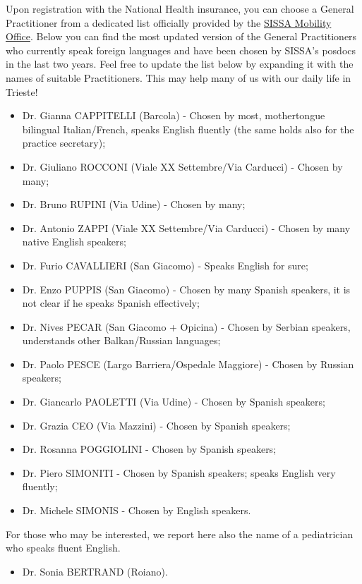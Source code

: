\documentclass{sissavademecum}
\begin{document}
Upon registration with the National Health insurance, you can choose a General Practitioner from a dedicated list officially provided by the \href{mobility@sissa.it}{SISSA Mobility Office}. Below you can find the most updated version of the General Practitioners who currently speak foreign languages and have been chosen by SISSA's posdocs in the last two years. Feel free to update the list below by expanding it with the names of suitable Practitioners. This may help many of us with our daily life in Trieste!
\begin{itemize}
    \item Dr. Gianna CAPPITELLI (Barcola) - Chosen by most, mothertongue bilingual Italian/French, speaks English fluently (the same holds also for the practice secretary);
    \item Dr. Giuliano ROCCONI (Viale XX Settembre/Via Carducci) - Chosen by many;
    \item Dr. Bruno RUPINI (Via Udine) - Chosen by many;
    \item Dr. Antonio ZAPPI (Viale XX Settembre/Via Carducci) - Chosen by many native English speakers;
    \item Dr. Furio CAVALLIERI (San Giacomo) - Speaks English for sure;
    \item Dr. Enzo PUPPIS (San Giacomo) - Chosen by many Spanish speakers, it is not clear if he speaks Spanish effectively;
    \item Dr. Nives PECAR (San Giacomo + Opicina) - Chosen by Serbian speakers, understands other Balkan/Russian languages;
    \item Dr. Paolo PESCE (Largo Barriera/Ospedale Maggiore) - Chosen by Russian speakers;
    \item Dr. Giancarlo PAOLETTI (Via Udine) - Chosen by Spanish speakers;
    \item Dr. Grazia CEO (Via Mazzini) - Chosen by Spanish speakers;
    \item Dr. Rosanna POGGIOLINI - Chosen by Spanish speakers;
    \item Dr. Piero SIMONITI - Chosen by Spanish speakers; speaks English very fluently;
    \item Dr. Michele SIMONIS - Chosen by English speakers.
\end{itemize}
For those who may be interested, we report here also the name of a pediatrician who speaks fluent English.
\begin{itemize}
    \item Dr. Sonia BERTRAND (Roiano).
\end{itemize}
\end{document}
